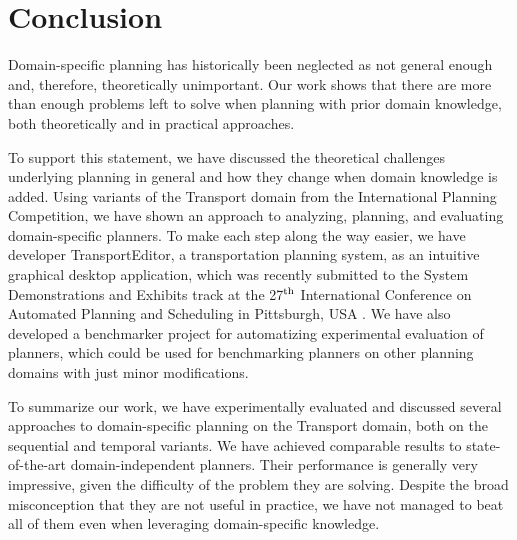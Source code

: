 \chapter*{Conclusion}

Domain-specific planning has historically been neglected as not general enough
and, therefore, theoretically unimportant.
Our work shows that there are more than enough problems
left to solve when planning with prior domain knowledge,
both theoretically and in practical approaches.

To support this statement,
we have discussed the theoretical challenges underlying
planning in general and how they change when
domain knowledge is added.
Using variants of the Transport domain from the International Planning Competition,
we have shown an approach to analyzing,
planning, and evaluating domain-specific planners.
To make each step along the way easier, we have developer TransportEditor,
a transportation planning system, as an intuitive graphical desktop application,
which was recently submitted  to the System Demonstrations and Exhibits
track at the 27$^{\textrm{th}}$ International Conference on Automated Planning and Scheduling
in Pittsburgh, USA \citep{Skopek2017}. We have also developed a benchmarker project
for automatizing experimental evaluation of planners, which could be used for benchmarking planners on
other planning domains with just minor modifications.

To summarize our work, we have experimentally evaluated and discussed several approaches to
domain-specific planning on the Transport domain, both on the sequential and temporal
variants.
We have achieved comparable results to state-of-the-art domain-independent planners. Their performance is generally very impressive, given the difficulty of the problem they are solving. Despite the broad misconception that they are not useful in practice,
we have not managed to beat all of them even when leveraging domain-specific knowledge.

